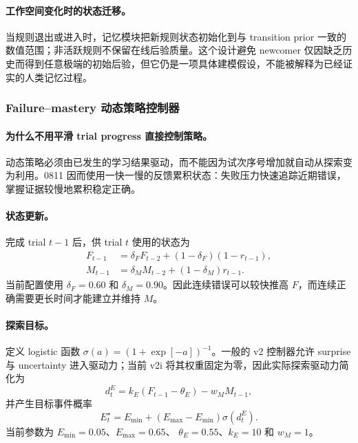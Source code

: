 \paragraph{工作空间变化时的状态迁移。}
当规则退出或进入时，记忆模块把新规则状态初始化到与 transition prior 一致的数值范围；非活跃规则不保留在线后验质量。这个设计避免 newcomer 仅因缺乏历史而得到任意极端的初始后验，但它仍是一项具体建模假设，不能被解释为已经证实的人类记忆过程。


\subsubsection{Failure--mastery 动态策略控制器}

\paragraph{为什么不用平滑 trial progress 直接控制策略。}
动态策略必须由已发生的学习结果驱动，而不能因为试次序号增加就自动从探索变为利用。0811 因而使用一快一慢的反馈累积状态：失败压力快速追踪近期错误，掌握证据较慢地累积稳定正确。

\paragraph{状态更新。}
完成 trial $t-1$ 后，供 trial $t$ 使用的状态为
\begin{align}
F_{t-1}
&=\delta_FF_{t-2}
+(1-\delta_F)(1-r_{t-1}),
\nonumber\\
M_{t-1}
&=\delta_MM_{t-2}
+(1-\delta_M)r_{t-1}.
\label{eq:model0811-failure-mastery}
\end{align}
当前配置使用 $\delta_F=0.60$ 和 $\delta_M=0.90$。因此连续错误可以较快推高 $F$，而连续正确需要更长时间才能建立并维持 $M$。

\paragraph{探索目标。}
定义 logistic 函数 $\sigma(a)=(1+\exp[-a])^{-1}$。一般的 v2 控制器允许 surprise 与 uncertainty 进入驱动力；当前 v2i 将其权重固定为零，因此实际探索驱动力简化为
\begin{equation}
d^E_t
=k_E(F_{t-1}-\theta_E)-w_MM_{t-1},
\label{eq:model0811-exploration-drive}
\end{equation}
并产生目标事件概率
\begin{equation}
E_t^\star
=E_{\min}+(E_{\max}-E_{\min})\sigma(d^E_t).
\label{eq:model0811-exploration-target}
\end{equation}
当前参数为 $E_{\min}=0.05$、$E_{\max}=0.65$、
$\theta_E=0.55$、$k_E=10$ 和 $w_M=1$。

